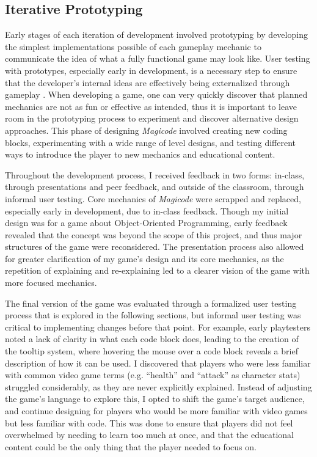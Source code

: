 \documentclass[10pt,twocolumn]{article}
\begin{document}
\subsection{Iterative Prototyping}
Early stages of each iteration of development involved prototyping by developing the simplest implementations possible of each gameplay mechanic to communicate the idea of what a fully functional game may look like. User testing with prototypes, especially early in development, is a necessary step to ensure that the developer’s internal ideas are effectively being externalized through gameplay \cite{prototyping}. When developing a game, one can very quickly discover that planned mechanics are not as fun or effective as intended, thus it is important to leave room in the prototyping process to experiment and discover alternative design approaches. This phase of designing \textit{Magicode} involved creating new coding blocks, experimenting with a wide range of level designs, and testing different ways to introduce the player to new mechanics and educational content.

Throughout the development process, I received feedback in two forms: in-class, through presentations and peer feedback, and outside of the classroom, through informal user testing. Core mechanics of \textit{Magicode} were scrapped and replaced, especially early in development, due to in-class feedback. Though my initial design was for a game about Object-Oriented Programming, early feedback revealed that the concept was beyond the scope of this project, and thus major structures of the game were reconsidered. The presentation process also allowed for greater clarification of my game’s design and its core mechanics, as the repetition of explaining and re-explaining led to a clearer vision of the game with more focused mechanics.

The final version of the game was evaluated through a formalized user testing process that is explored in the following sections, but informal user testing was critical to implementing changes before that point. For example, early playtesters noted a lack of clarity in what each code block does, leading to the creation of the tooltip system, where hovering the mouse over a code block reveals a brief description of how it can be used. I discovered that players who were less familiar with common video game terms (e.g. “health” and “attack” as character stats) struggled considerably, as they are never explicitly explained. Instead of adjusting the game’s language to explore this, I opted to shift the game’s target audience, and continue designing for players who would be more familiar with video games but less familiar with code. This was done to ensure that players did not feel overwhelmed by needing to learn too much at once, and that the educational content could be the only thing that the player needed to focus on.
\end{document}
